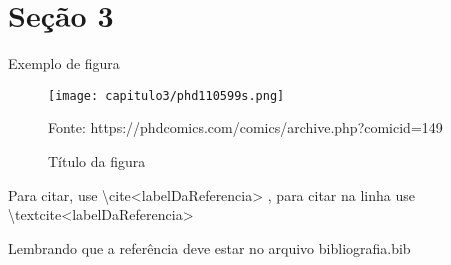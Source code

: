 \iffalse  \fi %

\section{Seção 3}
	
	Exemplo de figura

	\begin{figure}[H]
		\centering
		\texttt{[image: capitulo3/phd110599s.png]}
		\caption{Título da figura}		
		\label{fig:pythonModel}

		\footnotesize{Fonte: https://phdcomics.com/comics/archive.php?comicid=149}
	\end{figure}


	Para citar, use \textbackslash cite{<labelDaReferencia>} \cite{abubakar2010}, para citar na linha use \textbackslash textcite{<labelDaReferencia>} \textcite{Alakukku2003}
	
	Lembrando que a referência deve estar no arquivo bibliografia.bib

	




